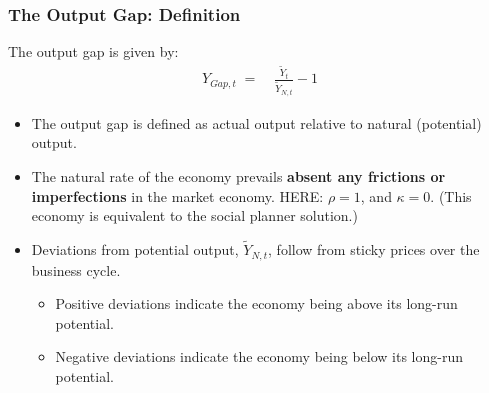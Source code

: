 \documentclass[10pt,c,aspectratio=1610,handout]{beamer}
\begin{document}
\begin{frame}%
  \frametitle{The Output Gap: Definition}%
  The output gap is given by:%
  \begin{align}%
    Y_{Gap,t} \; = & \; \frac{\tilde{Y}_t}{\tilde{Y}_{N,t}} - 1%
  \end{align}%
  \begin{itemize}%
    \item[$\blacktriangleright$] The output gap is defined as actual output relative to natural (potential) output.\vspace{0.1in}%
    \pause%
    \item[$\blacktriangleright$] The natural rate of the economy prevails \textbf{absent any frictions or imperfections} in the market economy. HERE: $\rho = 1$, and $\kappa = 0$. {\scriptsize (This economy is equivalent to the social planner solution.)}\vspace{0.1in}%
    \pause%
    \item[$\blacktriangleright$] Deviations from potential output, $\tilde{Y}_{N,t}$, follow from sticky prices over the business cycle.%
    \begin{itemize}%
      \footnotesize%
      \item[$\rightarrow$] Positive deviations indicate the economy being above its long-run potential.%
      \item[$\rightarrow$] Negative deviations indicate the economy being below its long-run potential.%
    \end{itemize}%
  \end{itemize}%
\end{frame}%
\end{document}

